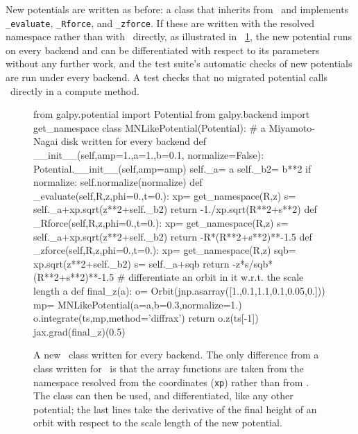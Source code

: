 New potentials are written as before: a class that inherits from
\pot\ and implements \texttt{\_evaluate}, \texttt{\_Rforce}, and
\texttt{\_zforce}. If these are written with the resolved namespace
rather than with \numpy\ directly, as illustrated in \figurename~\ref{fig:newpot},
the new potential runs on every backend and can be differentiated with
respect to its parameters without any further work, and the test suite's
automatic checks of new potentials are run under every backend. A test
checks that no migrated potential calls \numpy\ directly in a compute
method.

\begin{figure}[t!]
\begin{codefig}
from galpy.potential import Potential
from galpy.backend import get_namespace
class MNLikePotential(Potential):
    # a Miyamoto-Nagai disk written for every backend
    def __init__(self,amp=1.,a=1.,b=0.1,
                 normalize=False):
        Potential.__init__(self,amp=amp)
        self._a= a
        self._b2= b**2
        if normalize: self.normalize(normalize)
    def _evaluate(self,R,z,phi=0.,t=0.):
        xp= get_namespace(R,z)
        s= self._a+xp.sqrt(z**2+self._b2)
        return -1./xp.sqrt(R**2+s**2)
    def _Rforce(self,R,z,phi=0.,t=0.):
        xp= get_namespace(R,z)
        s= self._a+xp.sqrt(z**2+self._b2)
        return -R*(R**2+s**2)**-1.5
    def _zforce(self,R,z,phi=0.,t=0.):
        xp= get_namespace(R,z)
        sqb= xp.sqrt(z**2+self._b2)
        s= self._a+sqb
        return -z*s/sqb*(R**2+s**2)**-1.5
# differentiate an orbit in it w.r.t. the scale length a
def final_z(a):
    o= Orbit(jnp.asarray([1.,0.1,1.1,0.1,0.05,0.]))
    mp= MNLikePotential(a=a,b=0.3,normalize=1.)
    o.integrate(ts,mp,method='diffrax')
    return o.z(ts[-1])
jax.grad(final_z)(0.5)
\end{codefig}
\caption{A new \pot\ class written for every backend. The only
  difference from a class written for \numpy\ is that the array
  functions are taken from the namespace resolved from the coordinates
  (\texttt{xp}) rather than from \numpy. The class can then be used, and
  differentiated, like any other potential; the last lines take the
  derivative of the final height of an orbit with respect to the scale
  length of the new potential.}\label{fig:newpot}
\end{figure}
